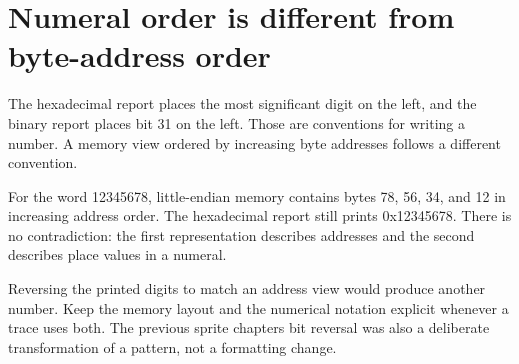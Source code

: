 \section{Numeral order is different from byte-address
  order}\label{004-bit-inspector-p08-numeral-order-is-different-from-byte-address-order}

The hexadecimal report places the most significant digit on the left,
and the binary report places bit 31 on the left. Those are conventions
for writing a number. A memory view ordered by increasing byte addresses
follows a different convention.

For the word 12345678, little-endian memory contains bytes 78, 56, 34,
and 12 in increasing address order. The hexadecimal report still prints
0x12345678. There is no contradiction: the first representation
describes addresses and the second describes place values in a numeral.

Reversing the printed digits to match an address view would produce
another number. Keep the memory layout and the numerical notation
explicit whenever a trace uses both. The previous sprite
chapter\textquotesingle s bit reversal was also a deliberate
transformation of a pattern, not a formatting change.
